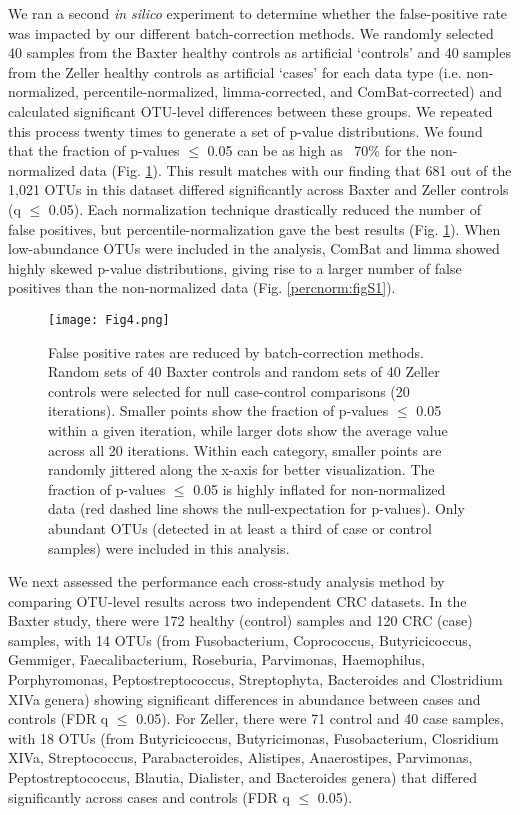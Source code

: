 We ran a second \textit{in silico} experiment to determine whether the false-positive rate was impacted by our different batch-correction methods.
We randomly selected 40 samples from the Baxter healthy controls as artificial `controls' and 40 samples from the Zeller healthy controls as artificial `cases' for each data type (i.e. non-normalized, percentile-normalized, limma-corrected, and ComBat-corrected) and calculated significant OTU-level differences between these groups.
We repeated this process twenty times to generate a set of p-value distributions.
We found that the fraction of p-values $\leq$ 0.05 can be as high as ~70\% for the non-normalized data (Fig. \ref{percnorm:fig4}).
This result matches with our finding that 681 out of the 1,021 OTUs in this dataset differed significantly across Baxter and Zeller controls (q $\leq$ 0.05).
Each normalization technique drastically reduced the number of false positives, but percentile-normalization gave the best results (Fig. \ref{percnorm:fig4}).
When low-abundance OTUs were included in the analysis, ComBat and limma showed highly skewed p-value distributions, giving rise to a larger number of false positives than the non-normalized data (Fig. \ref{percnorm:figS1}).

\begin{figure}[h]
\begin{center}
    \texttt{[image: Fig4.png]}
    \caption{False positive rates are reduced by batch-correction methods. Random sets of 40 Baxter controls and random sets of 40 Zeller controls were selected for null case-control comparisons (20 iterations). Smaller points show the fraction of p-values $\leq$ 0.05 within a given iteration, while larger dots show the average value across all 20 iterations. Within each category, smaller points are randomly jittered along the x-axis for better visualization. The fraction of p-values $\leq$ 0.05 is highly inflated for non-normalized data (red dashed line shows the null-expectation for p-values). Only abundant OTUs (detected in at least a third of case or control samples) were included in this analysis.}\label{percnorm:fig4}
\end{center}
\end{figure}

We next assessed the performance each cross-study analysis method by comparing OTU-level results across two independent CRC datasets.
In the Baxter study, there were 172 healthy (control) samples and 120 CRC (case) samples, with 14 OTUs (from Fusobacterium, Coprococcus, Butyricicoccus, Gemmiger, Faecalibacterium, Roseburia, Parvimonas, Haemophilus, Porphyromonas, Peptostreptococcus, Streptophyta, Bacteroides and Clostridium XIVa genera) showing significant differences in abundance between cases and controls (FDR q $\leq$ 0.05).
For Zeller, there were 71 control and 40 case samples, with 18 OTUs (from Butyricicoccus, Butyricimonas, Fusobacterium, Closridium XIVa, Streptococcus, Parabacteroides, Alistipes, Anaerostipes, Parvimonas, Peptostreptococcus, Blautia, Dialister, and Bacteroides genera) that differed significantly across cases and controls (FDR q $\leq$ 0.05).


